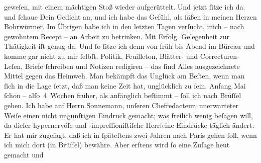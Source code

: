 \begin{ledgroupsized}[t]{13cm}
               geweſen, mit einem mächtigen Stoß wieder aufgerüttelt. Und jetzt ſitze ich
                  da\textcolor{gray}{,} und ſchaue Dein Gedicht an, und ich habe das Gefühl, als ſäßen in meinen
               Herzen \label{T_L02661-1v}\label{T_L02661-1h} Bohrwürmer.\pend
           \pstart
           Im Übrigen habe ich in den letzten Tagen verſucht, mich – nach gewohntem Recept – an
               Arbeit zu betrinken. Mit Erfolg. Gelegenheit zur Thätigkeit iſt genug da. Und ſo
               ſitze ich denn von früh bis Abend im Büreau und komme  gar nicht zu mir ſelbſt. Politik, Feuilleton, Blätter- und
               Correcturen-Leſen, Briefe ſchreiben und Notizen redigiren – {\pb}das ſind Alles ausgezeichnete Mittel gegen das
               Heimweh. Man bekämpft das Unglück am Beſten, wenn man ſich in die Lage ſetzt, daß man
               keine Zeit hat, unglücklich zu ſein. Anfang Mai ſchon –
               alſo 4 Wochen früher, als anfänglich beſtimmt – ſoll ich nach Brüſſel gehen. Ich habe auf Herrn Sonnemann, unſeren Chefredacteur, unerwarteter Weiſe einen nicht ungünſtigen
               Eindruck gemacht; was freilich wenig beſagen will, da dieſer hypernervöſe und
               -impreſſioniſtiſche Herr\textcolor{gray}{ſe}ine Eindrücke täglich ändert. Er hat mir zugeſagt, daß ich in
               ſpäteſtens zwei Jahren nach Paris gehen ſoll,
               wenn ich mich dort (in Brüſſel)
                  bewähre\textcolor{gray}{.} Aber erſtens wird ſo eine Zuſage heut gemacht und

\end{ledgroupsized}
